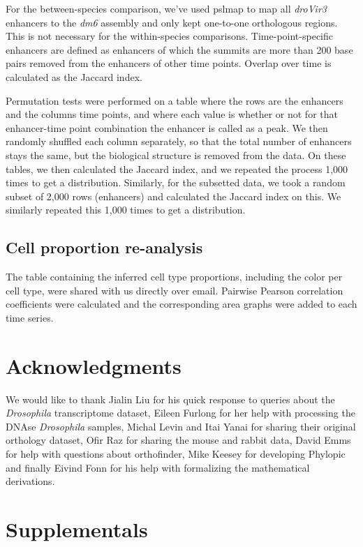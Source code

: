 For the between-species comparison, we've used pslmap to map all \textit{droVir3} enhancers to the \textit{dm6} assembly and only kept one-to-one orthologous regions.  This is not necessary for the within-species comparisons. Time-point-specific enhancers are defined as enhancers of which the summits are more than 200 base pairs removed from the enhancers of other time points. Overlap over time is calculated as the Jaccard index.

Permutation tests were performed on a table where the rows are the enhancers and the columns time points, and where each value is whether or not for that enhancer-time point combination the enhancer is called as a peak. We then randomly shuffled each column separately, so that the total number of enhancers stays the same, but the biological structure is removed from the data. On these tables, we then calculated the Jaccard index, and we repeated the process 1,000 times to get a distribution. Similarly, for the subsetted data, we took a random subset of 2,000 rows (enhancers) and calculated the Jaccard index on this. We similarly repeated this 1,000 times to get a distribution.

\subsection{Cell proportion re-analysis}

The table containing the inferred cell type proportions, including the color per cell type, were shared with us directly over email. Pairwise Pearson correlation coefficients were calculated and the corresponding area graphs were added to each time series.

\section{Acknowledgments}

We would like to thank Jialin Liu for his quick response to queries about the \textit{Drosophila} transcriptome dataset, Eileen Furlong for her help with processing the DNAse \textit{Drosophila} samples, Michal Levin and Itai Yanai for sharing their original orthology dataset, Ofir Raz for sharing the mouse and rabbit data, David Emms for help with questions about orthofinder, Mike Keesey for developing Phylopic and finally Eivind Fonn for his help with formalizing the mathematical derivations.

\section{Supplementals}

